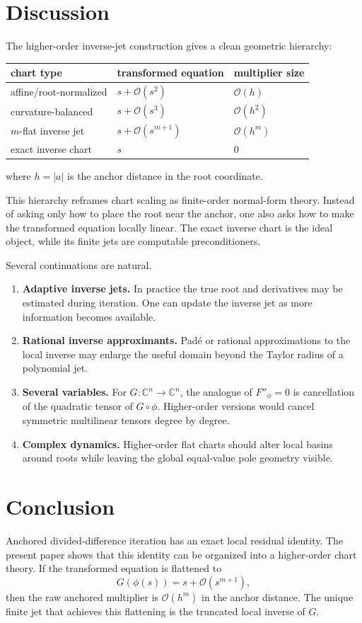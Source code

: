 \documentclass[11pt]{article}
\theoremstyle{definition}
\newcommand{\C}{\mathbb{C}}
\newcommand{\Oterm}{\mathcal{O}}
\begin{document}
\section{Discussion}
The higher-order inverse-jet construction gives a clean geometric hierarchy:
\begin{center}
\begin{tabular}{lll}
\toprule
chart type & transformed equation & multiplier size \\
\midrule
affine/root-normalized & $s+\Oterm(s^2)$ & $\Oterm(h)$ \\
curvature-balanced & $s+\Oterm(s^3)$ & $\Oterm(h^2)$ \\
$m$-flat inverse jet & $s+\Oterm(s^{m+1})$ & $\Oterm(h^m)$ \\
exact inverse chart & $s$ & $0$ \\
\bottomrule
\end{tabular}
\end{center}
where $h=|a|$ is the anchor distance in the root coordinate.

This hierarchy reframes chart scaling as finite-order normal-form theory. Instead of asking only how to place the root near the anchor, one also asks how to make the transformed equation locally linear. The exact inverse chart is the ideal object, while its finite jets are computable preconditioners.

Several continuations are natural.
\begin{enumerate}[label=(\roman*)]
    \item \textbf{Adaptive inverse jets.} In practice the true root and derivatives may be estimated during iteration. One can update the inverse jet as more information becomes available.
    \item \textbf{Rational inverse approximants.} Pad\'e or rational approximations to the local inverse may enlarge the useful domain beyond the Taylor radius of a polynomial jet.
    \item \textbf{Several variables.} For $G:\C^n\to\C^n$, the analogue of $F''_{\phi}=0$ is cancellation of the quadratic tensor of $G\circ\phi$. Higher-order versions would cancel symmetric multilinear tensors degree by degree.
    \item \textbf{Complex dynamics.} Higher-order flat charts should alter local basins around roots while leaving the global equal-value pole geometry visible.
\end{enumerate}

\section{Conclusion}
Anchored divided-difference iteration has an exact local residual identity. The present paper shows that this identity can be organized into a higher-order chart theory. If the transformed equation is flattened to
\[
G(\phi(s))=s+\Oterm(s^{m+1}),
\]
then the raw anchored multiplier is $\Oterm(h^m)$ in the anchor distance. The unique finite jet that achieves this flattening is the truncated local inverse of $G$.
\end{document}
